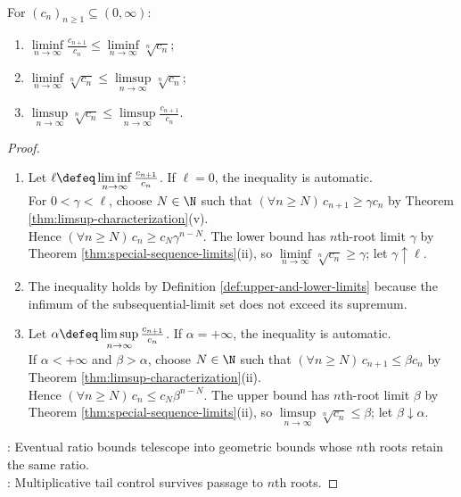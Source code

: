 \begin{theorem} \label{thm:root-test-dominates-ratio-test} \\
For $(c_n)_{n\geq1}\subseteq(0,\infty)$:
\begin{enumerate}[label=(\roman*)]
\setlength{\itemsep}{0pt}
\item $\liminf\limits_{n\to\infty}\frac{c_{n+1}}{c_n}\leq \liminf\limits_{n\to\infty}\sqrt[n]{c_n}$;
\item $\liminf\limits_{n\to\infty}\sqrt[n]{c_n}\leq \limsup\limits_{n\to\infty}\sqrt[n]{c_n}$;
\item $\limsup\limits_{n\to\infty}\sqrt[n]{c_n}\leq \limsup\limits_{n\to\infty}\frac{c_{n+1}}{c_n}$.
\end{enumerate}
\begin{proof}
\begin{enumerate}[label=(\roman*)]
\setlength{\itemsep}{0pt}
\item Let $\ell\defeq\liminf\limits_{n\to\infty}\frac{c_{n+1}}{c_n}$. If $\ell=0$, the inequality is automatic.\\
For $0<\gamma<\ell$, choose $N\in\N$ such that $(\forall n\geq N)\,c_{n+1}\geq\gamma c_n$ by Theorem \ref{thm:limsup-characterization}(v).\\
Hence $(\forall n\geq N)\,c_n\geq c_N\gamma^{n-N}$. The lower bound has $n$th-root limit $\gamma$ by Theorem \ref{thm:special-sequence-limits}(ii), so $\liminf\limits_{n\to\infty}\sqrt[n]{c_n}\geq\gamma$; let $\gamma\uparrow\ell$.
\item The inequality holds by Definition \ref{def:upper-and-lower-limits} because the infimum of the subsequential-limit set does not exceed its supremum.
\item Let $\alpha\defeq\limsup\limits_{n\to\infty}\frac{c_{n+1}}{c_n}$. If $\alpha=+\infty$, the inequality is automatic.\\
If $\alpha<+\infty$ and $\beta>\alpha$, choose $N\in\N$ such that $(\forall n\geq N)\,c_{n+1}\leq\beta c_n$ by Theorem \ref{thm:limsup-characterization}(ii).\\
Hence $(\forall n\geq N)\,c_n\leq c_N\beta^{n-N}$. The upper bound has $n$th-root limit $\beta$ by Theorem \ref{thm:special-sequence-limits}(ii), so $\limsup\limits_{n\to\infty}\sqrt[n]{c_n}\leq\beta$; let $\beta\downarrow\alpha$.
\end{enumerate}
: Eventual ratio bounds telescope into geometric bounds whose $n$th roots retain the same ratio.\\
: Multiplicative tail control survives passage to $n$th roots.
\end{proof}
\end{theorem}

